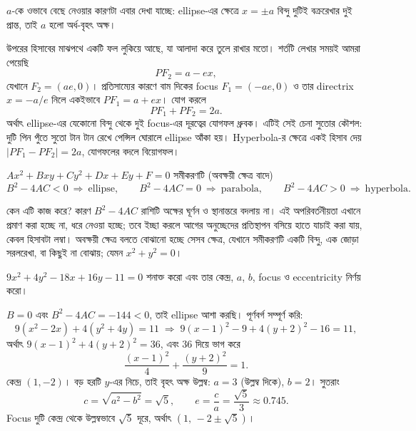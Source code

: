 \documentclass[11pt]{article}
\begin{document}
$a$-কে ওভাবে বেছে নেওয়ার কারণটা এবার দেখা যাচ্ছে: ellipse-এর ক্ষেত্রে $x = \pm a$
বিন্দু দুটিই বক্ররেখার দুই প্রান্ত, তাই $a$ হলো অর্ধ-বৃহৎ অক্ষ।

উপরের হিসাবের মাঝপথে একটি ফল লুকিয়ে আছে, যা আলাদা করে তুলে রাখার মতো। শর্তটি
লেখার সময়ই আমরা পেয়েছি
\[
  PF_{2} = a - ex ,
\]
যেখানে $F_{2} = (ae, 0)$। প্রতিসাম্যের কারণে বাম দিকের focus $F_{1} = (-ae,0)$
ও তার directrix $x = -a/e$ নিলে একইভাবে $PF_{1} = a + ex$। যোগ করলে
\[
  PF_{1} + PF_{2} = 2a .
\]
অর্থাৎ ellipse-এর যেকোনো বিন্দু থেকে দুই focus-এর দূরত্বের যোগফল ধ্রুবক। এটিই
সেই চেনা সুতোর কৌশল: দুটি পিন পুঁতে সুতো টান টান রেখে পেন্সিল ঘোরালে ellipse
আঁকা হয়। Hyperbola-র ক্ষেত্রে একই হিসাব দেয় $|PF_{1} - PF_{2}| = 2a$, যোগফলের
বদলে বিয়োগফল।

\begin{idea}[সাধারণ দ্বিঘাত সমীকরণ চেনা]
$Ax^{2} + Bxy + Cy^{2} + Dx + Ey + F = 0$ সমীকরণটি (অবক্ষয়ী ক্ষেত্র বাদে)
\[
  B^{2} - 4AC < 0 \ \Rightarrow \ \mathrm{ellipse}, \qquad
  B^{2} - 4AC = 0 \ \Rightarrow \ \mathrm{parabola}, \qquad
  B^{2} - 4AC > 0 \ \Rightarrow \ \mathrm{hyperbola} .
\]
\end{idea}

কেন এটি কাজ করে? কারণ $B^{2}-4AC$ রাশিটি অক্ষের ঘূর্ণন ও স্থানান্তরে বদলায় না।
এই অপরিবর্তনীয়তা এখানে প্রমাণ করা হচ্ছে না, ধরে নেওয়া হচ্ছে; তবে ইচ্ছা করলে
আগের অনুচ্ছেদের প্রতিস্থাপন বসিয়ে হাতে যাচাই করা যায়, কেবল হিসাবটা লম্বা।
অবক্ষয়ী ক্ষেত্র বলতে বোঝানো হচ্ছে সেসব ক্ষেত্র, যেখানে সমীকরণটি একটি বিন্দু,
এক জোড়া সরলরেখা, বা কিছুই না বোঝায়; যেমন $x^{2}+y^{2} = 0$।

\begin{example}
$9x^{2} + 4y^{2} - 18x + 16y - 11 = 0$ শনাক্ত করো এবং তার কেন্দ্র, $a$, $b$,
focus ও eccentricity নির্ণয় করো।
\end{example}

\begin{solbox}
$B = 0$ এবং $B^{2}-4AC = -144 < 0$, তাই ellipse আশা করছি। পূর্ণবর্গ সম্পূর্ণ
করি:
\[
  9(x^{2}-2x) + 4(y^{2}+4y) = 11
  \;\Longrightarrow\; 9(x-1)^{2} - 9 + 4(y+2)^{2} - 16 = 11 ,
\]
অর্থাৎ $9(x-1)^{2} + 4(y+2)^{2} = 36$, এবং $36$ দিয়ে ভাগ করে
\[
  \frac{(x-1)^{2}}{4} + \frac{(y+2)^{2}}{9} = 1 .
\]
কেন্দ্র $(1,-2)$। বড় হরটি $y$-এর নিচে, তাই বৃহৎ অক্ষ উল্লম্ব: $a = 3$ (উল্লম্ব
দিকে), $b = 2$। সুতরাং
\[
  c = \sqrt{a^{2}-b^{2}} = \sqrt{5}, \qquad e = \frac{c}{a} = \frac{\sqrt{5}}{3}
  \approx 0.745 .
\]
Focus দুটি কেন্দ্র থেকে উল্লম্বভাবে $\sqrt{5}$ দূরে, অর্থাৎ
$\left( 1,\, -2 \pm \sqrt{5} \right)$।
\end{solbox}
\end{document}

